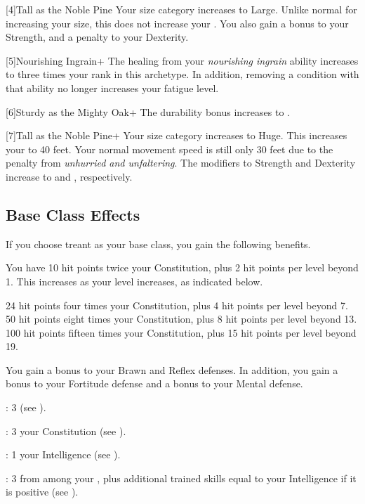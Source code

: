     [4]{Tall as the Noble Pine} Your size category increases to Large.
      Unlike normal for increasing your size, this does not increase your .
      You also gain a  bonus to your Strength, and a  penalty to your Dexterity.

    [5]{Nourishing Ingrain+} The healing from your \textit{nourishing ingrain} ability increases to three times your rank in this archetype.
      In addition, removing a condition with that ability no longer increases your fatigue level.

    [6]{Sturdy as the Mighty Oak+} The durability bonus increases to .

    [7]{Tall as the Noble Pine+} Your size category increases to Huge.
      This increases your  to 40 feet.
      Your normal movement speed is still only 30 feet due to the penalty from \textit{unhurried and unfaltering}.
      The modifiers to Strength and Dexterity increase to  and , respectively.

  \subsection{Base Class Effects}
    \veryhighhpprogressiontable

    If you choose treant as your base class, you gain the following benefits.

      You have 10 hit points \add twice your Constitution, plus 2 hit points per level beyond 1.
      This increases as your level increases, as indicated below.
      \begin{raggeditemize}
         24 hit points \add four times your Constitution, plus 4 hit points per level beyond 7.
         50 hit points \add eight times your Constitution, plus 8 hit points per level beyond 13.
         100 hit points \add fifteen times your Constitution, plus 15 hit points per level beyond 19.
      \end{raggeditemize}

      You gain a  bonus to your Brawn and Reflex defenses.
      In addition, you gain a  bonus to your Fortitude defense and a  bonus to your Mental defense.

      \begin{raggeditemize}
          \item {}: 3 (see ).
          \item {}: 3 \add your Constitution (see ).
          \item {}: 1 \add your Intelligence (see ).
          \item {}: 3 from among your , plus additional trained skills equal to your Intelligence if it is positive (see ).
      \end{raggeditemize}

